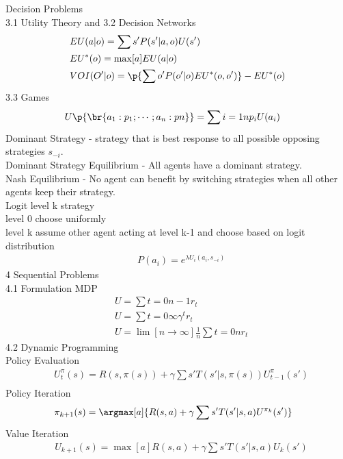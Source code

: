 \documentclass[10pt, oneside]{article}
\begin{document}
\begin{multicols}{2}
 Decision Problems \\
3.1 Utility Theory and 3.2 Decision Networks
  \begin{align*}
    & EU(a|o) = \sum{s'}{}{P(s'| a, o)U(s')} \\
    & EU^*(o) = \max[a]{EU(a|o)} \\
    & VOI(O'|o) = \p{\sum{o'}{}{P(o' | o)EU^*(o,o')}} - EU^*(o)
  \end{align*}
3.3 Games
  \begin{align*}
    & U\p{\br{a_1 : p_1; \cdots; a_n : pn}} = \sum{i = 1}{n}{p_i U(a_i)}
  \end{align*}
  Dominant Strategy - strategy that is best response to all possible opposing
  strategies $s_{-i}$. \\
  Dominant Strategy Equilibrium - All agents have a dominant strategy. \\
  Nash Equilibrium - No agent can benefit by switching strategies when all other
  agents keep their strategy. \\
  Logit level k strategy \\
  level 0 choose uniformly  \\
  level k assume other agent acting at level k-1 and choose based on logit
  distribution \\
  \begin{align*}
    & P(a_i) = e^{\lambda U_i(a_i, s_{-i})}
  \end{align*}
4 Sequential Problems \\
4.1 Formulation MDP
  \begin{align*}
    & U = \sum{t = 0}{n-1}{r_t} \\
    & U = \sum{t = 0}{\infty}{ \gamma^t r_t} \\
    & U = \lim[n \to \infty]{\frac{1}{n}\sum{t = 0}{n}{r_t}}
  \end{align*}
4.2 Dynamic Programming \\
  Policy Evaluation
  \begin{align*}
    & U_t^{\pi}(s) = R(s, \pi(s)) + \gamma \sum{s'}{}{T(s'|s, \pi(s))U_{t-1}^{\pi}(s')} \\
  \end{align*}
  Policy Iteration
  \begin{align*}
    &\pi_{k+1}(s) = \argmax[a]{R(s,a) + \gamma \sum{s'}{}{T(s'|s, a)U^{\pi_k}(s')}}
  \end{align*}
  Value Iteration
  \begin{align*}
    & U_{k+1}(s) = \max[a]{R(s, a) + \gamma \sum{s'}{}{T(s'|s, a)U_k(s')}} \\

\end{align*}
\end{multicols}
\end{document}
